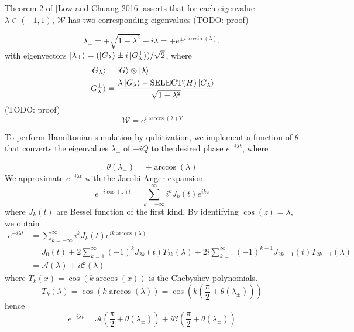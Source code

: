 \documentclass[11pt, oneside]{article}   	%
\begin{document}
Theorem 2 of [Low and Chuang 2016] asserts that for each eigenvalue $\lambda \in (-1, 1)$, $\mathcal{W}$ has two corresponding eigenvalues (TODO: proof)

\begin{equation*} 
\lambda_{\pm} = \mp \sqrt{1 - \lambda^2} - i \lambda = \mp e^{\pm i \arcsin(\lambda)},
\end{equation*}
with eigenvectors $\ket{\lambda_{\pm}} = (\ket{G_{\lambda}} \pm i \ket{G^{\perp}_{\lambda}})/\sqrt{2}$, where
\begin{align*} 
\ket{G_{\lambda}} &= \ket{G} \otimes \ket{\lambda} \\
\ket{G^{\perp}_{\lambda}} &= \frac{\lambda \ket{G_{\lambda}} - \textrm{SELECT}(H) \ket{G_{\lambda}}}{\sqrt{1 - \lambda^2}}
\end{align*}
(TODO: proof)
\begin{equation*} 
\mathcal{W} = e^{i \arccos(\lambda) Y}
\end{equation*}

To perform Hamiltonian simulation by qubitization, we implement a function of $\theta$ that converts the eigenvalues $\lambda_{\pm}$ of $-iQ$ to the desired phase 
$e^{-i \lambda t}$, where %

\begin{equation*} 
\theta (\lambda_{\pm}) = \mp \arccos(\lambda)
\end{equation*}
We approximate $e^{-i \lambda t}$ with the Jacobi-Anger expansion
\begin{equation*} 
e^{-i \cos(z) t} = \sum^{\infty}_{k=-\infty} i^k J_k(t) e^{i k z}
\end{equation*}
where $J_k(t)$ are Bessel function of the first kind.
By identifying $\cos(z) = \lambda$, we obtain
\begin{align*} 
e^{-i \lambda t} 
&= \sum^{\infty}_{k=-\infty} i^k J_k(t) e^{i k \arccos(\lambda)} \\
&= J_0(t) + 2 \sum^{\infty}_{k=1} (-1)^{k} J_{2k}(t) T_{2k}(\lambda) + 2i \sum^{\infty}_{k=1} (-1)^{k-1} J_{2k-1}(t) T_{2k-1}(\lambda) \\
&= \mathcal{A}(\lambda) + i \mathcal{C}(\lambda)
\end{align*}
where $T_k (x) = \cos(k \arccos(x))$ is the Chebyshev polynomials.
\begin{equation*} 
T_k (\lambda) = \cos(k \arccos(\lambda)) = \cos \left( k \left( \frac{\pi}{2} + \theta(\lambda_{\pm}) \right) \right)
\end{equation*}
hence 
\begin{equation*}
e^{-i \lambda t} = \mathcal{A} \left( \frac{\pi}{2} + \theta(\lambda_{\pm}) \right) + i \mathcal{C} \left( \frac{\pi}{2} + \theta(\lambda_{\pm}) \right)
\end{equation*}
\end{document}
